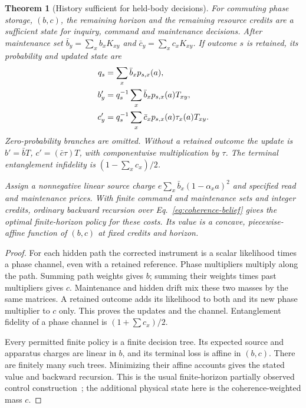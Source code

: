 \documentclass[11pt]{article}
\newtheorem{theorem}{Theorem}[section]
\theoremstyle{definition}
\theoremstyle{remark}
\begin{document}
\begin{theorem}[History sufficient for held-body decisions]
\label{thm:coherence-belief}
For commuting phase storage, $(b,c)$, the remaining horizon and the remaining
resource credits are a sufficient state for inquiry, command and maintenance
decisions. After maintenance set
$\bar b_y=\sum_xb_xK_{xy}$ and $\bar c_y=\sum_xc_xK_{xy}$.
If outcome $s$ is retained, its probability and updated state are
\begin{align}
 q_s&=\sum_x\bar b_xp_{s,x}(a),\notag\\
 b'_y&=q_s^{-1}\sum_x\bar b_xp_{s,x}(a)T_{xy},\notag\\
 c'_y&=q_s^{-1}\sum_x\bar c_xp_{s,x}(a)\tau_x(a)T_{xy}.
 \label{eq:coherence-belief}
\end{align}
Zero-probability branches are omitted. Without a retained outcome the update is
$b'=\bar bT$, $c'=(\bar c\tau)T$, with componentwise multiplication by
$\tau$. The terminal entanglement infidelity is
$(1-\sum_xc_x)/2$.

Assign a nonnegative linear source charge
$e\sum_x\bar b_x(1-\alpha_xa)^2$ and specified read and maintenance
prices. With finite command and maintenance sets and integer credits, ordinary
backward recursion over Eq.~\eqref{eq:coherence-belief} gives the optimal
finite-horizon policy for these costs. Its value is a concave, piecewise-affine
function of $(b,c)$ at fixed credits and horizon.
\end{theorem}
\begin{proof}
For each hidden path the corrected instrument is a scalar likelihood times
a phase channel, even with a retained reference. Phase multipliers multiply
along the path. Summing path weights gives $b$; summing their weights times
past multipliers gives $c$. Maintenance and hidden drift mix these two masses
by the same matrices. A retained outcome adds its likelihood to both and its
new phase multiplier to $c$ only. This proves the updates and the channel.
Entanglement fidelity of a phase channel is $(1+\sum c_x)/2$.

Every permitted finite policy is a finite decision tree. Its expected source
and apparatus charges are linear in $b$, and its terminal loss is affine in
$(b,c)$. There are finitely many such trees. Minimizing their affine accounts
gives the stated value and backward recursion. This is the usual finite-horizon
partially observed control construction~\cite{SmallwoodSondik1973}; the
additional physical state here is the coherence-weighted mass $c$.
\end{proof}
\end{document}
